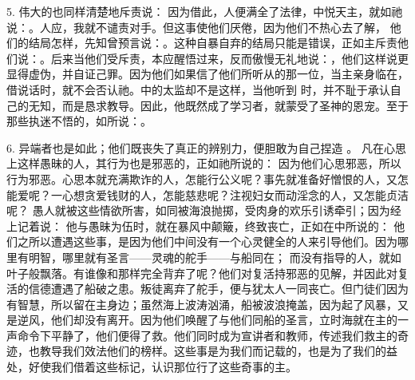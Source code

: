 5. 伟大的也同样清楚地斥责说： 因为借此，人便满全了法律，中悦天主，就如祂说：。人应，我就不谴责对手。但这事使他们厌倦，因为他们不热心去了解， 他们的结局怎样，先知曾预言说：。这种自暴自弃的结局只能是错误，正如主斥责他们说：。后来当他们受斥责，本应醒悟过来，反而傲慢无礼地说：，他们这样说更显得虚伪，并自证己罪。因为他们如果信了他们所听从的那一位，当主亲身临在，借说话时，就不会否认祂。中的太监却不是这样，当他听到 时，并不耻于承认自己的无知，而是恳求教导。因此，他既然成了学习者，就蒙受了圣神的恩宠。至于那些执迷不悟的，如所说：。\par

6. 异端者也是如此；他们既丧失了真正的辨别力，便胆敢为自己捏造 。 凡在心思上这样愚昧的人，其行为也是邪恶的，正如祂所说的： 因为他们心思邪恶，所以行为邪恶。心思本就充满欺诈的人，怎能行公义呢？事先就准备好憎恨的人，又怎能爱呢？一心想贪爱钱财的人，怎能慈悲呢？注视妇女而动淫念的人，又怎能贞洁呢？ 愚人就被这些情欲所害，如同被海浪抛掷，受肉身的欢乐引诱牵引；因为经上记着说： 他与愚昧为伍时，就在暴风中颠簸，终致丧亡，正如在中所说的： 他们之所以遭遇这些事，是因为他们中间没有一个心灵健全的人来引导他们。因为哪里有明智，哪里就有圣言——灵魂的舵手——与船同在； 而没有指导的人，就如叶子般飘落。有谁像和那样完全背弃了呢？他们对复活持邪恶的见解，并因此对复活的信德遭遇了船破之患。叛徒离弃了舵手，便与犹太人一同丧亡。但门徒们因为有智慧，所以留在主身边；虽然海上波涛汹涌，船被波浪掩盖，因为起了风暴，又是逆风，他们却没有离开。因为他们唤醒了与他们同船的圣言，立时海就在主的一声命令下平静了，他们便得了救。他们同时成为宣讲者和教师，传述我们救主的奇迹，也教导我们效法他们的榜样。这些事是为我们而记载的，也是为了我们的益处，好使我们借着这些标记，认识那位行了这些奇事的主。\par

